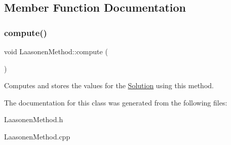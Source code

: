 \subsection{Member Function Documentation}
\mbox{\label{class_laasonen_method_ac5507d58a6c59f0ba9eaa3ca54a51f5d}} 
\subsubsection{\texorpdfstring{compute()}{compute()}}
{\footnotesize\ttfamily void Laasonen\+Method\+::compute (\begin{DoxyParamCaption}{ }\end{DoxyParamCaption})}

Computes and stores the values for the \hyperlink{class_solution}{Solution} using this method. 

The documentation for this class was generated from the following files\+:\begin{DoxyCompactItemize}
\item 
Laasonen\+Method.\+h\item 
Laasonen\+Method.\+cpp\end{DoxyCompactItemize}
